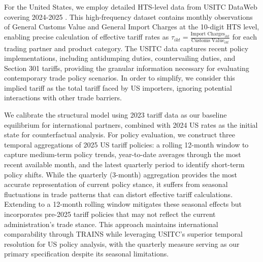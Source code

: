 For the United States, we employ detailed HTS-level data from USITC DataWeb covering 2024-2025 \citep{USITC2025}. This high-frequency dataset contains monthly observations of General Customs Value and General Import Charges at the 10-digit HTS level, enabling precise calculation of effective tariff rates as $\tau_{ikt} = \frac{\text{Import Charges}_{ikt}}{\text{Customs Value}_{ikt}}$ for each trading partner and product category. The USITC data captures recent policy implementations, including antidumping duties, countervailing duties, and Section 301 tariffs, providing the granular information necessary for evaluating contemporary trade policy scenarios. In order to simplify, we consider this implied tariff as the total tariff faced by US importers, ignoring potential interactions with other trade barriers.

We calibrate the structural model using 2023 tariff data as our baseline equilibrium for international partners, combined with 2024 US rates as the initial state for counterfactual analysis. For policy evaluation, we construct three temporal aggregations of 2025 US tariff policies: a rolling 12-month window to capture medium-term policy trends, year-to-date averages through the most recent available month, and the latest quarterly period to identify short-term policy shifts. While the quarterly (3-month) aggregation provides the most accurate representation of current policy stance, it suffers from seasonal fluctuations in trade patterns that can distort effective tariff calculations. Extending to a 12-month rolling window mitigates these seasonal effects but incorporates pre-2025 tariff policies that may not reflect the current administration's trade stance. This approach maintains international comparability through TRAINS while leveraging USITC's superior temporal resolution for US policy analysis, with the quarterly measure serving as our primary specification despite its seasonal limitations.
